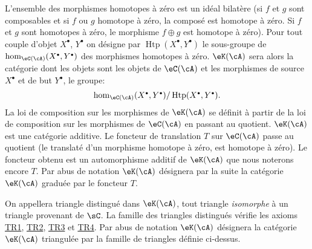 L'ensemble des morphismes homotopes à zéro est un idéal bilatère (si 
$f$ et $g$ sont composables et si $f$ ou $g$ homotope à zéro, la composé 
est homotope à zéro. Si $f$ et $g$ sont homotopes à zéro, le morphisme 
$f\oplus g$ est homotope à zéro). Pour tout couple d'objet $X^\bullet$, 
$Y^\bullet$ on désigne par $\operatorname{Htp}(X^\bullet,Y^\bullet)$ le 
sous-groupe de $\hom_{\eC(\cA)}(X^\bullet,Y^\bullet)$ des morphismes homotopes 
à zéro. $\eK(\cA)$ sera alors la catégorie dont les objets sont les 
objets de $\eC(\cA)$ et les morphismes de source $X^\bullet$ et de but 
$Y^\bullet$, le groupe: 
\[
  \hom_{\eC(\cA)}(X^\bullet,Y^\bullet) / \operatorname{Htp}(X^\bullet,Y^\bullet) \text{.}
\]
La loi de composition sur les morphismes de $\eK(\cA)$ se définit à partir 
de la loi de composition sur les morphismes de $\eC(\cA)$ en passant au 
quotient. $\eK(\cA)$ est une catégorie additive. Le foncteur de translation 
$T$ sur $\eC(\cA)$ passe au quotient (le translaté d'un morphisme homotope 
à zéro, est homotope à zéro). Le foncteur obtenu est un automorphisme 
additif de $\eK(\cA)$ que nous noterons encore $T$. Par abus de notation 
$\eK(\cA)$ désignera par la suite la catégorie $\eK(\cA)$ graduée par le 
foncteur $T$. 

On appellera triangle distingué dans $\eK(\cA)$, tout triangle 
\emph{isomorphe} à un triangle provenant de $\sC$. La famille des triangles 
distingués vérifie les axioms \hyperref[VIII:TR1]{TR1}, 
\hyperref[VIII:TR2]{TR2}, \hyperref[VIII:TR3]{TR3} et 
\hyperref[VIII:TR4]{TR4}. Par abus de notation $\eK(\cA)$ désignera la 
catégorie $\eK(\cA)$ triangulée par la famille de triangles définie 
ci-dessus. 





\subsubsection{}\label{VIII:1-2-3}


